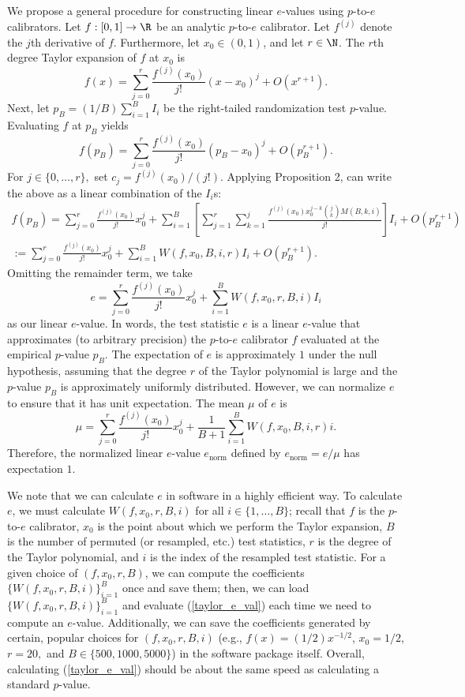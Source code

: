 \documentclass[12pt]{article}
\begin{document}
We propose a general procedure for constructing linear $e$-values using $p$-to-$e$ calibrators. Let $f:[0,1] \to \R$ be an analytic $p$-to-$e$ calibrator. Let $f^{(j)}$ denote the $j$th derivative of $f$. Furthermore, let $x_0 \in (0,1)$, and let $r \in \N$. The $r$th degree Taylor expansion of $f$ at $x_0$ is
$$f(x) = \sum_{j=0}^r \frac{f^{(j)}(x_0)}{j!}(x-x_0)^j + O(x^{r+1}).$$ Next, let $p_B = (1/B) \sum_{i=1}^B  I_i$ be the right-tailed randomization test $p$-value. Evaluating $f$ at $p_B$ yields
$$f(p_B) = \sum_{j=0}^r \frac{ f^{(j)}(x_0) }{j!} (p_B - x_0)^j + O(p_B^{r+1}).$$ For $j \in \{0, \dots, r\},$ set $c_j = f^{(j)}(x_0)/(j!).$ Applying Proposition 2, can write the above as a linear combination of the $I_i$s:
\begin{multline*}
f(p_B) = \sum_{j=0}^r \frac{f^{(j)}(x_0)}{j!} x_0^j + \sum_{i=1}^B \left[\sum_{j=1}^r \sum_{k=1}^j  \frac{f^{(j)}(x_0) x_0^{j-k} \binom{j}{k} M(B,k,i) }{j!} \right] I_i + O(p_B^{r+1})  \\ := \sum_{j=0}^r \frac{f^{(j)}(x_0)}{j!} x_0^j  + \sum_{i=1}^B W(f, x_0, B, i, r) I_i + O(p^{r + 1}_B).
\end{multline*}
Omitting the remainder term, we take
\begin{equation}\label{taylor_e_val}
e = \sum_{j=0}^r \frac{f^{(j)}(x_0)}{j!} x^j_0 + \sum_{i=1}^B  W(f,x_0,r,B,i) I_i
\end{equation}
 as our linear $e$-value. In words, the test statistic $e$ is a linear $e$-value that approximates (to arbitrary precision) the $p$-to-$e$ calibrator $f$ evaluated at the empirical $p$-value $p_B$. The expectation of $e$ is approximately $1$ under the null hypothesis, assuming that the degree $r$ of the Taylor polynomial is large and the $p$-value $p_B$ is approximately uniformly distributed. However, we can normalize $e$ to ensure that it has unit expectation. The mean $\mu$ of $e$ is
$$ \mu = \sum_{j=0}^r \frac{ f^{(j)}(x_0) }{j!}x_0^j  + \frac{1}{B+1} \sum_{i=1}^B W(f,x_0,B,i,r) i.$$ Therefore, the normalized linear $e$-value $e_\textrm{norm}$ defined by $e_\textrm{norm} = e/\mu$ has expectation $1$. 

We note that we can calculate $e$ in software in a highly efficient way. To calculate $e$, we must calculate $W(f,x_0,r,B,i)$ for all $i \in \{1, \dots, B\}$; recall that $f$ is the $p$-to-$e$ calibrator, $x_0$ is the point about which we perform the Taylor expansion, $B$ is the number of permuted (or resampled, etc.) test statistics, $r$ is the degree of the Taylor polynomial, and $i$ is the index of the resampled test statistic. For a given choice of $(f, x_0, r, B)$, we can compute the coefficients $\{ W(f, x_0, r, B, i) \}_{i=1}^B$ once and save them; then, we can load $\{ W(f, x_0, r, B, i) \}_{i=1}^B$ and evaluate (\ref{taylor_e_val}) each time we need to compute an $e$-value. Additionally, we can save the coefficients generated by certain, popular choices for $(f, x_0, r, B, i)$ (e.g., $f(x) = (1/2)x^{-1/2}$, $x_0 = 1/2$, $r = 20,$ and $B  \in \{500, 1000, 5000\}$) in the software package itself. Overall, calculating (\ref{taylor_e_val}) should be about the same speed as calculating a standard $p$-value.
\end{document}
